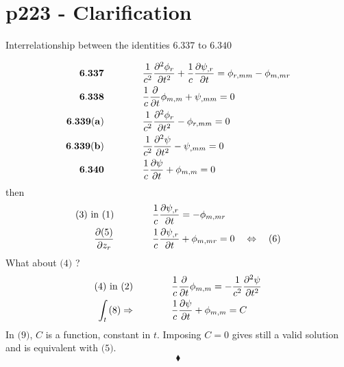 \section{p223 - Clarification}
\begin{tcolorbox}
Interrelationship between the identities $\mathbf{6.337}$ to $\mathbf{6.340}$
\end{tcolorbox}
\begin{align}
\mathbf{6.337} \quad\quad\quad\quad &\frac{1}{c^2}\frac{\partial^2 \phi_r}{\partial t^2}+ \frac{1}{c} \pdv{\psi_{,r}}{t} = \phi_{r,mm}-\phi_{m,mr}\\
\mathbf{6.338} \quad\quad\quad\quad &\frac{1}{c}\frac{\partial}{\partial t} \phi_{m,m}+ \psi_{,mm}=0\\
\mathbf{6.339(a)} \quad\quad\quad\quad &\frac{1}{c^2}\frac{\partial^2 \phi_r}{\partial t^2}-  \phi_{r,mm}=0\\
\mathbf{6.339(b)} \quad\quad\quad\quad &\frac{1}{c^2}\frac{\partial^2 \psi}{\partial t^2}-  \psi_{,mm}=0\\
\mathbf{6.340} \quad\quad\quad\quad &\frac{1}{c}\frac{\partial \psi}{\partial t}+ \phi_{m,m}=0
\end{align}
then
\begin{align}
\text{(3) in (1)}\quad\quad\quad\quad & \frac{1}{c} \pdv{\psi_{,r}}{t} =-\phi_{m,mr}\\
\pdv{\text{(5)}}{z_r}\quad\quad\quad\quad &\frac{1}{c}\frac{\partial \psi_{,r}}{\partial t}+ \phi_{m,mr}=0\quad \Leftrightarrow \quad \text{(6)}
\end{align}
What about $\text{(4)}$ ?\\
\begin{align}
\text{(4) in (2)}\quad\quad\quad\quad & \frac{1}{c}\frac{\partial}{\partial t} \phi_{m,m}=-\frac{1}{c^2}\frac{\partial^2 \psi}{\partial t^2}\\
\int_{t} \text{(8)}\Rightarrow\quad\quad\quad\quad &\frac{1}{c}\frac{\partial \psi}{\partial t}+ \phi_{m,m}=C
\end{align}
In $\text{(9)}$, $C$ is a function, constant in $t$. Imposing $C=0$ gives still a valid solution and is equivalent with $\text{(5)}$.
 $$\blacklozenge$$
\newpage


